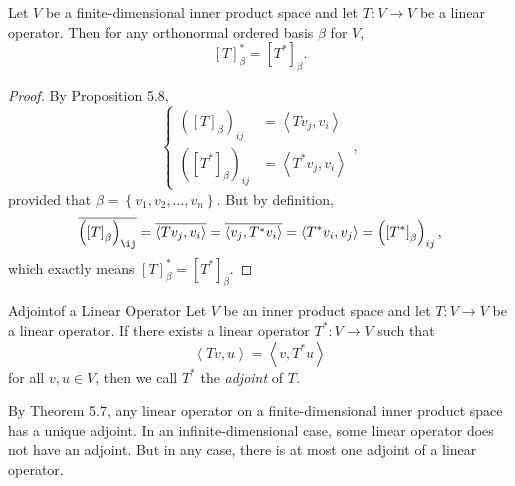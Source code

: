 \documentclass[linearalgebraII]{subfiles}
\begin{document}
    \begin{cor}{}
        Let $V$ be a finite-dimensional inner product space and let $T:V\to V$ be a linear operator. Then for any orthonormal ordered basis $\beta$ for $V$,
        \begin{equation*}
            \left[ T \right] _\beta^* = \left[ T^* \right] _\beta.
        \end{equation*}
    \end{cor}	

    \begin{proof}
        By Proposition 5.8,
        \begin{equation*}
            \begin{cases} 
                \left( \left[ T \right] _\beta \right) _{ij} & = \left\langle Tv_j, v_i\right\rangle \\
                \left( \left[ T^* \right] _\beta \right) _{ij} & = \left\langle T^*v_j, v_i\right\rangle 
            \end{cases},
        \end{equation*}
        provided that $\beta = \left\lbrace v_1,v_2,\ldots,v_n \right\rbrace$. But by definition, 
        \begin{equation*}
            \overline{\left( \left[ T \right] _\beta \right) _{\ij}} = \overline{\left\langle Tv_j, v_i\right\rangle } = \overline{\left\langle v_j, T^*v_i\right\rangle} = \left\langle T^*v_i, v_j\right\rangle = \left( \left[ T^* \right] _\beta \right) _{ij},
        \end{equation*}
        which exactly means $\left[ T \right] _\beta^* = \left[ T^* \right] _\beta$.
    \end{proof}

    \begin{definition}{Adjoint}{of a Linear Operator}
        Let $V$ be an inner product space and let $T:V\to V$ be a linear operator. If there exists a linear operator $T^*:V\to V$ such that
        \begin{equation*}
            \left\langle Tv, u\right\rangle = \left\langle v, T^*u\right\rangle 
        \end{equation*}
        for all $v,u\in V$, then we call $T^*$ the \emph{adjoint} of $T$.
    \end{definition}

    \begin{remark}
        By Theorem 5.7, any linear operator on a finite-dimensional inner product space has a unique adjoint. In an infinite-dimensional case, some linear operator does not have an adjoint. But in any case, there is at most one adjoint of a linear operator.
    \end{remark}
\end{document}
